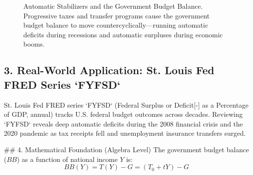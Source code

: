 \documentclass[11pt,letterpaper]{article}
\begin{document}
\begin{figure}[htbp]
\centering
{}
\caption{Automatic Stabilizers and the Government Budget Balance. Progressive taxes and transfer programs cause the government budget balance to move countercyclically—running automatic deficits during recessions and automatic surpluses during economic booms.}
\label{fig:automatic_stabilizers}
\end{figure}

\subsection*{3. Real-World Application: St. Louis Fed FRED Series `FYFSD`}
St. Louis Fed FRED series `FYFSD` (Federal Surplus or Deficit[-] as a Percentage of GDP, annual) tracks U.S. federal budget outcomes across decades. Reviewing `FYFSD` reveals deep automatic deficits during the 2008 financial crisis and the 2020 pandemic as tax receipts fell and unemployment insurance transfers surged.

## 4. Mathematical Foundation (Algebra Level)
The government budget balance ($BB$) as a function of national income $Y$ is:
\begin{equation}
BB(Y) = T(Y) - G = (T_0 + tY) - G
\end{equation}
\end{document}
